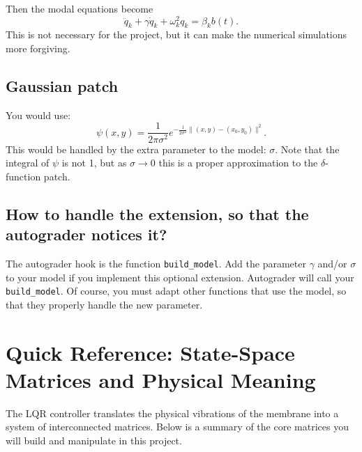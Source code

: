 \documentclass[11pt]{article}
\begin{document}
Then the modal equations become
\[
\ddot q_k + \gamma \dot q_k + \omega_k^2 q_k = \beta_k b(t).
\]
This is not necessary for the project, but it can make the numerical 
simulations more forgiving.

\subsection{ Gaussian patch}
You would use:
\[ \psi(x,y) = \frac{1}{2\pi\sigma^2} e^{-\frac{1}{2\sigma^2} \|(x,y)-(x_0,y_0)\|^2}. \]
This would be handled by the extra parameter to the model: \( \sigma \).
Note that the integral of \(\psi\) is not 1, but as \(\sigma\to 0\) this is
a proper approximation to the \(\delta\)-function patch.


\subsection{How to handle the extension, so that the autograder notices it?}
The autograder hook is the function \texttt{build\_model}. Add the
parameter \(\gamma\) and/or \(\sigma\) to your model if you implement
this optional extension.  Autograder will call your
\texttt{build\_model}. Of course, you must adapt other functions that
use the model, so that they properly handle the new parameter.

\section*{Quick Reference: State-Space Matrices and Physical Meaning}
The LQR controller translates the physical vibrations of the membrane into a system of interconnected matrices. Below is a summary of the core matrices you will build and manipulate in this project.
\end{document}
